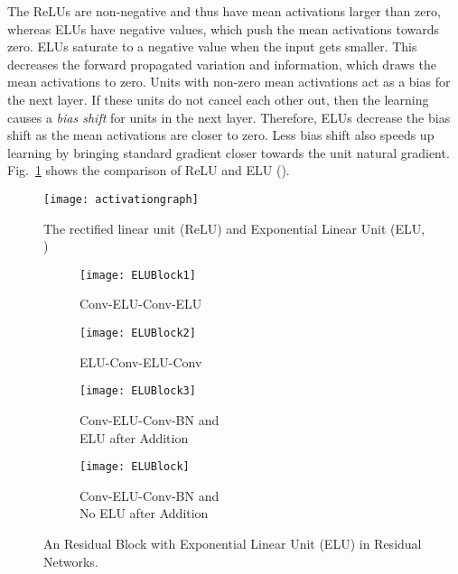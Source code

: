 \documentclass[10pt,twocolumn,letterpaper]{article}
\begin{document}
The ReLUs are non-negative and thus have mean activations larger than zero, whereas ELUs have negative values, which push the mean activations towards zero. ELUs saturate to a negative value when the input gets smaller. This decreases the forward propagated variation and information, which draws the mean activations to zero. Units with non-zero mean activations act as a bias for the next layer. If these units do not cancel each other out, then the learning causes a \emph{bias shift} for units in the next layer. Therefore, ELUs decrease the bias shift as the mean activations are closer to zero. Less bias shift also speeds up learning by bringing standard gradient closer towards the unit natural gradient. Fig.~\ref{fig:elu} shows the comparison of ReLU and ELU ().

\begin{figure}
\centering
\texttt{[image: activationgraph]}
\caption{The rectified linear unit (ReLU) and Exponential Linear Unit (ELU, )}
\label{fig:elu}
\end{figure}




\begin{figure*}
    \centering
    \begin{subfigure}{.24\linewidth}
        \centering
        \texttt{[image: ELUBlock1]}
        \caption{Conv-ELU-Conv-ELU}
        \label{fig:Conv-ELU-Conv-ELU}
    \end{subfigure}
    \begin{subfigure}{.24\linewidth}
        \centering
        \texttt{[image: ELUBlock2]}
        \caption{ELU-Conv-ELU-Conv}
        \label{fig:ELU-Conv-ELU-Conv}
    \end{subfigure}
    \begin{subfigure}{.24\linewidth}
        \centering
        \texttt{[image: ELUBlock3]}
        \caption{Conv-ELU-Conv-BN and \\ ELU after Addition}
        \label{fig:Conv-ELU-Conv-BN1}
    \end{subfigure}
    \begin{subfigure}{.24\linewidth}
        \centering
        \texttt{[image: ELUBlock]}
        \caption{Conv-ELU-Conv-BN and \\ No ELU after Addition}
        \label{fig:Conv-ELU-Conv-BN2}
    \end{subfigure}
    \caption{An  Residual Block with Exponential Linear Unit (ELU) in Residual Networks.}
    \label{fig:ELUBlocks}
\end{figure*}
\end{document}
